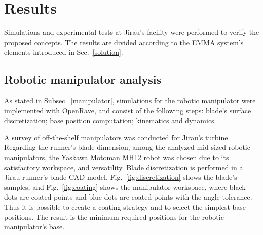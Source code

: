 \section{Results}



Simulations and experimental tests at Jirau's facility were performed to verify
the proposed concepts. The results are divided according to the EMMA system's
elements introduced in Sec.~\ref{solution}. 

\subsection{Robotic manipulator analysis}\label{sec::man_analysis}

As stated in Subsec.~\ref{manipulator}, simulations for the robotic
manipulator were implemented with OpenRave, and consist of the following steps:
blade's surface discretization; base position computation; kinematics
and dynamics.

A survey of off-the-shelf manipulators was conducted for
Jirau's turbine. Regarding the runner's blade dimension, among the analyzed
mid-sized robotic manipulators, the Yaskawa Motoman MH12 robot was chosen due to its satisfactory
workspace, and versatility. Blade discretization is performed in a Jirau
runner's blade CAD model, Fig.~\ref{fig:discretization} shows the blade's
samples, and Fig.~\ref{fig:coating} shows the manipulator workspace, where
black dots are coated points and blue dots are coated points with the angle
tolerance. Thus it is possible to create a coating strategy and to select the
simplest base positions. The result is the minimum required positions for the
robotic manipulator's base.

